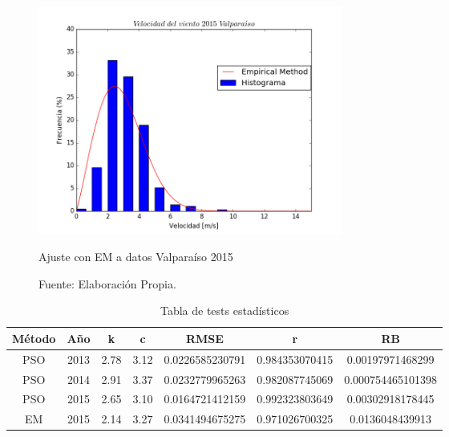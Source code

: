 \begin{figure}[h!]
    \centering
    \includegraphics[height=75mm]{figures/result_2015_EM.png}
    \caption{Ajuste con EM a datos Valparaíso 2015}
    \vspace{-.25cm}
    \caption*{Fuente: Elaboración Propia.}
    \label{fig:em_valpo_15}
\end{figure}
\begin{table}[htb!]
    \centering
    \caption{Tabla de tests estadísticos}
    \label{table:stadistical_tests}
    \begin{tabular}{|c|c|c|c|c|c|c|}
        \hline
        \textbf{Método} & \textbf{Año} & \textbf{k} & \textbf{c} & \textbf{RMSE} & \textbf{r} & \textbf{RB}\\
        \hline
        PSO & 2013 & 2.78 & 3.12 &0.0226585230791 & 0.984353070415 & 0.00197971468299\\
        PSO & 2014 & 2.91 & 3.37 &0.0232779965263 & 0.982087745069 & 0.000754465101398\\
        PSO & 2015 & 2.65 & 3.10 &0.0164721412159 & 0.992323803649 & 0.00302918178445\\
        \hline
        EM & 2015 & 2.14 & 3.27 & 0.0341494675275 & 0.971026700325 & 0.0136048439913\\
        \hline
    \end{tabular}
\end{table}
\pagebreak

